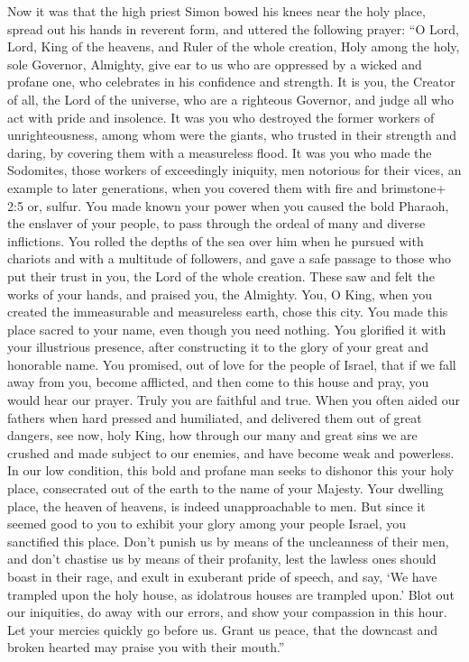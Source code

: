  Now it was that the high priest Simon bowed his knees near
the holy place, spread out his hands in reverent form, and uttered the
following prayer:  ``O Lord, Lord, King of the heavens, and
Ruler of the whole creation, Holy among the holy, sole Governor,
Almighty, give ear to us who are oppressed by a wicked and profane one,
who celebrates in his confidence and strength.  It is you,
the Creator of all, the Lord of the universe, who are a righteous
Governor, and judge all who act with pride and insolence. 
It was you who destroyed the former workers of unrighteousness, among
whom were the giants, who trusted in their strength and daring, by
covering them with a measureless flood.  It was you who made
the Sodomites, those workers of exceedingly iniquity, men notorious for
their vices, an example to later generations, when you covered them with
fire and brimstone+ 2:5 or, sulfur.  You made known your
power when you caused the bold Pharaoh, the enslaver of your people, to
pass through the ordeal of many and diverse inflictions. 
You rolled the depths of the sea over him when he pursued with chariots
and with a multitude of followers, and gave a safe passage to those who
put their trust in you, the Lord of the whole creation. 
These saw and felt the works of your hands, and praised you, the
Almighty.  You, O King, when you created the immeasurable
and measureless earth, chose this city. You made this place sacred to
your name, even though you need nothing. You glorified it with your
illustrious presence, after constructing it to the glory of your great
and honorable name.  You promised, out of love for the
people of Israel, that if we fall away from you, become afflicted, and
then come to this house and pray, you would hear our prayer.
 Truly you are faithful and true.  When you
often aided our fathers when hard pressed and humiliated, and delivered
them out of great dangers,  see now, holy King, how through
our many and great sins we are crushed and made subject to our enemies,
and have become weak and powerless.  In our low condition,
this bold and profane man seeks to dishonor this your holy place,
consecrated out of the earth to the name of your Majesty. 
Your dwelling place, the heaven of heavens, is indeed unapproachable to
men.  But since it seemed good to you to exhibit your glory
among your people Israel, you sanctified this place.  Don't
punish us by means of the uncleanness of their men, and don't chastise
us by means of their profanity, lest the lawless ones should boast in
their rage, and exult in exuberant pride of speech, and say,
 `We have trampled upon the holy house, as idolatrous
houses are trampled upon.'  Blot out our iniquities, do
away with our errors, and show your compassion in this hour.
 Let your mercies quickly go before us. Grant us peace,
that the downcast and broken hearted may praise you with their mouth.''

